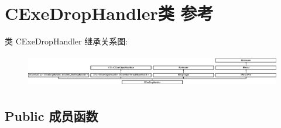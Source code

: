 \hypertarget{class_c_exe_drop_handler}{}\section{C\+Exe\+Drop\+Handler类 参考}
\label{class_c_exe_drop_handler}
类 C\+Exe\+Drop\+Handler 继承关系图\+:\begin{figure}[H]
\begin{center}
\leavevmode
\includegraphics[height=1.462141cm]{class_c_exe_drop_handler}
\end{center}
\end{figure}
\subsection*{Public 成员函数}
